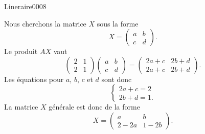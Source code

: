 \begin{corrige}{Lineraire0008}

	Nous cherchons la matrice $X$ sous la forme
	\begin{equation}
		X=\begin{pmatrix}
			a	&	b	\\ 
			c	&	d	
		\end{pmatrix}.
	\end{equation}
	Le produit $AX$ vaut
	\begin{equation}
		\begin{pmatrix}
			2	&	1	\\ 
			2	&	1	
		\end{pmatrix}
		\begin{pmatrix}
			a	&	b	\\ 
			c	&	d	
		\end{pmatrix}
		=
		\begin{pmatrix}
			2a+c	&	2b+d	\\ 
			2a+c	&	2b+d	
		\end{pmatrix}.
	\end{equation}
	Les équations pour $a$, $b$, $c$ et $d$ sont donc
	\begin{equation}
		\left\{
		\begin{array}{ll}
			2a+c=2\\
			2b+d=1.
		\end{array}
		\right.
	\end{equation}
	La matrice $X$ générale est donc de la forme
	\begin{equation}
		X=\begin{pmatrix}
			a	&	b	\\ 
			2-2a	&	1-2b	
		\end{pmatrix}.
	\end{equation}
	

\end{corrige}
